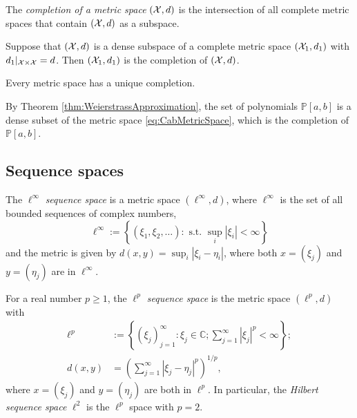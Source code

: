 \begin{defn}
  \label{def:completionMetricSpace}
  The \emph{completion of a metric space} $({\cal X}, d)$ 
  is the intersection of all complete metric spaces
  that contain $({\cal X}, d)$ as a subspace.
\end{defn}

\begin{lem}
  \label{lem:denseCompletion}
  Suppose that $({\cal X}, d)$ is a dense subspace
  of a complete metric space $({\cal X}_1, d_1)$
  with $d_1|_{{\cal X}\times{\cal X}} = d$.
  Then $({\cal X}_1, d_1)$ is the completion of $({\cal X}, d)$.
\end{lem}

\begin{thm}
  \label{thm:existenceOfMetricCompletion}
  Every metric space has a unique completion.
\end{thm}

\begin{exm}
  \label{exm:polynomialDenseInCab}
  By Theorem \ref{thm:WeierstrassApproximation}, 
  the set of polynomials $\mathbb{P}[a,b]$
  is a dense subset of the metric space \eqref{eq:CabMetricSpace}, 
  which is the completion of $\mathbb{P}[a,b]$.
\end{exm}

\subsection{Sequence spaces}
\label{sec:metric-spaces-basicAnal}

\begin{defn}
  \label{def:lInftySeqSpace}
  The $\ell^{\infty}$ \emph{sequence space} 
  is a metric space $(\ell^{\infty},d)$,
  where $\ell^{\infty}$ is the set of all bounded sequences
  of complex numbers,
  \begin{equation}
    \label{eq:ellInftySpace}
    \ell^{\infty} := \left\{
      (\xi_1, \xi_2, \ldots):
      \text{ s.t. } \sup_{i}|\xi_i| < \infty
      \right\}
  \end{equation}
  and the metric is given by
  $d(x,y) = \sup_{i}|\xi_i- \eta_i|$, 
  where both $x=(\xi_j)$ and $y=(\eta_j)$ are in $\ell^{\infty}$. 
\end{defn}

\begin{defn}
  \label{def:lpSpace}
  For a real number $p\ge 1$,
   the \emph{$\ell^p$ sequence space} is the metric space $(\ell^p, d)$
   with
  \begin{align}
    \label{eq:lpSpace}
    \ell^p &:= \left\{
               (\xi_j)_{j=1}^{\infty}: \xi_j\in \mathbb{C};
               \sum_{j=1}^{\infty} |\xi_j|^p < \infty
    \right\};
    \\
    \label{eq:lpMetric}
    d(x,y) &= \left(\sum_{j=1}^{\infty} |\xi_j -\eta_j|^p\right)^{1/p},
  \end{align}             
  where $x=(\xi_j)$ and $y=(\eta_j)$ are both in $\ell^p$.
  In particular, the \emph{Hilbert sequence space} $\ell^2$
   is the $\ell^p$ space with $p=2$.
\end{defn}

